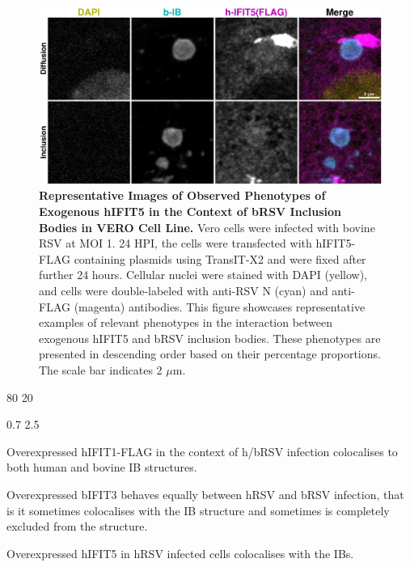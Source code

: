 \begin{figure}
    \centering
    \includegraphics[width=1\linewidth]{09. Chapter 4/Figs/02. Overexpression/04. IFIT5/06. i5-brsv.pdf}
    \caption[Representative Images of Observed Phenotypes of Exogenous hIFIT5 in the Context of bRSV Inclusion Bodies in VERO Cell Line.]{\textbf{Representative Images of Observed Phenotypes of Exogenous hIFIT5 in the Context of bRSV Inclusion Bodies in VERO Cell Line.} Vero cells were infected with bovine RSV at MOI 1. 24 HPI, the cells were transfected with hIFIT5-FLAG containing plasmids using TransIT-X2 and were fixed after further 24 hours. Cellular nuclei were stained with DAPI (yellow), and cells were double-labeled with anti-RSV N (cyan) and anti-FLAG (magenta) antibodies. This figure showcases representative examples of relevant phenotypes in the interaction between exogenous hIFIT5 and bRSV inclusion bodies. These phenotypes are presented in descending order based on their percentage proportions. The scale bar indicates 2 \(\mu \mbox{m}\).}
    \label{fig:Representative Images of Observed Phenotypes of Exogenous hIFIT5 in the Context of bRSV Inclusion Bodies in VERO Cell Line}
\end{figure}

80 20

0.7 2.5

Overexpressed hIFIT1-FLAG in the context of h/bRSV infection colocalises to both human and bovine IB structures.

Overexpressed bIFIT3 behaves equally between hRSV and bRSV infection, that is it sometimes colocalises with the IB structure and sometimes is completely excluded from the structure.

Overexpressed hIFIT5 in hRSV infected cells colocalises with the IBs.